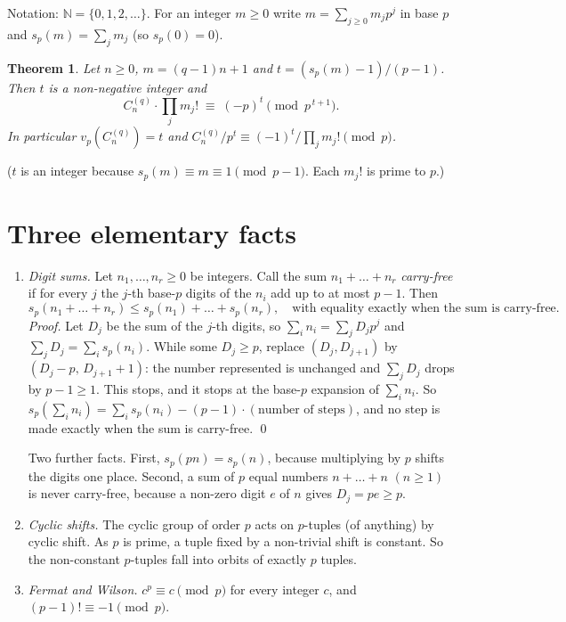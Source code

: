 \documentclass[11pt]{article}
\newtheorem{theorem}{Theorem}
\theoremstyle{definition}
\theoremstyle{remark}
\newcommand{\N}{\mathbb N}
\newcommand{\C}{C_n^{(q)}}
\begin{document}
Notation: $\N=\{0,1,2,\dots\}$. For an integer $m\ge0$ write $m=\sum_{j\ge0}m_jp^j$ in base
$p$ and $s_p(m)=\sum_jm_j$ (so $s_p(0)=0$).

\begin{theorem}\label{thm}
Let $n\ge0$, $m=(q-1)n+1$ and $t=(s_p(m)-1)/(p-1)$. Then $t$ is a non-negative integer and
\[
 \C\cdot\prod_{j}m_j!\;\equiv\;(-p)^{t}\pmod{p^{\,t+1}} .
\]
In particular $v_p(\C)=t$ and $\C/p^{t}\equiv(-1)^t/\prod_jm_j!\pmod p$.
\end{theorem}

($t$ is an integer because $s_p(m)\equiv m\equiv1\pmod{p-1}$. Each $m_j!$ is prime to $p$.)

\section{Three elementary facts}

\begin{enumerate}[label=\textbf{(E\arabic*)},leftmargin=3.2em]
\item\label{E1} \emph{Digit sums.} Let $n_1,\dots,n_r\ge0$ be integers. Call the sum
$n_1+\dots+n_r$ \emph{carry-free} if for every $j$ the $j$-th base-$p$ digits of the $n_i$
add up to at most $p-1$. Then
\[
 s_p(n_1+\dots+n_r)\le s_p(n_1)+\dots+s_p(n_r),\quad\text{with equality exactly when the sum
 is carry-free.}
\]
\emph{Proof.} Let $D_j$ be the sum of the $j$-th digits, so $\sum_in_i=\sum_jD_jp^j$ and
$\sum_jD_j=\sum_is_p(n_i)$. While some $D_j\ge p$, replace $(D_j,D_{j+1})$ by
$(D_j-p,\,D_{j+1}+1)$: the number represented is unchanged and $\sum_jD_j$ drops by $p-1\ge1$.
This stops, and it stops at the base-$p$ expansion of $\sum_in_i$. So
$s_p(\sum_in_i)=\sum_is_p(n_i)-(p-1)\cdot(\text{number of steps})$, and no step is made
exactly when the sum is carry-free. \qed

Two further facts. First, $s_p(pn)=s_p(n)$, because multiplying by $p$ shifts the digits one
place. Second, a sum of $p$ equal numbers $n+\dots+n$ $(n\ge1)$ is never carry-free, because a
non-zero digit $e$ of $n$ gives $D_j=pe\ge p$.

\item\label{E2} \emph{Cyclic shifts.} The cyclic group of order $p$ acts on $p$-tuples
(of anything) by cyclic shift. As $p$ is prime, a tuple fixed by a non-trivial shift is
constant. So the non-constant $p$-tuples fall into orbits of exactly $p$ tuples.

\item\label{E3} \emph{Fermat and Wilson.} $c^p\equiv c\pmod p$ for every integer $c$, and
$(p-1)!\equiv-1\pmod p$.
\end{enumerate}
\end{document}
